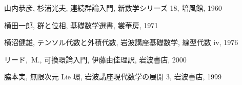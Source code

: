\documentclass[12pt,twoside]{jarticle}
\begin{document}
\begin{thebibliography}{ABCD}
山内恭彦, 杉浦光夫, 連続群論入門, 新数学シリーズ 18, 培風館, 1960

横田一郎, 群と位相, 基礎数学選書, 裳華房, 1971

横沼健雄, テンソル代数と外積代数, 岩波講座基礎数学, 線型代数 iv, 1976

リード,~M., 可換環論入門, 伊藤由佳理訳, 岩波書店, 2000

脇本実, 無限次元 Lie 環, 岩波講座現代数学の展開 3, 岩波書店, 1999

\end{thebibliography}

\end{document}
